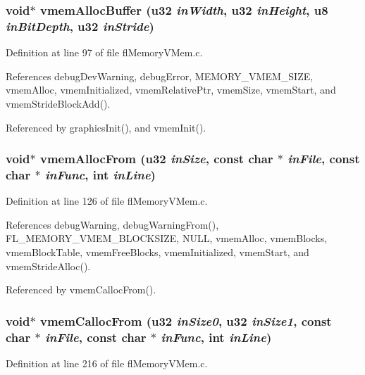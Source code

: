 \subsubsection{\setlength{\rightskip}{0pt plus 5cm}void$\ast$ vmem\-Alloc\-Buffer (u32 {\em in\-Width}, u32 {\em in\-Height}, u8 {\em in\-Bit\-Depth}, u32 {\em in\-Stride})}\label{flMemoryVMem_8h_e971a3895e09e6afd7520db283258211}




Definition at line 97 of file fl\-Memory\-VMem.c.

References debug\-Dev\-Warning, debug\-Error, MEMORY\_\-VMEM\_\-SIZE, vmem\-Alloc, vmem\-Initialized, vmem\-Relative\-Ptr, vmem\-Size, vmem\-Start, and vmem\-Stride\-Block\-Add().

Referenced by graphics\-Init(), and vmem\-Init().
\subsubsection{\setlength{\rightskip}{0pt plus 5cm}void$\ast$ vmem\-Alloc\-From (u32 {\em in\-Size}, const char $\ast$ {\em in\-File}, const char $\ast$ {\em in\-Func}, int {\em in\-Line})}\label{flMemoryVMem_8h_fc3b16b88f6442e62ab9aacc0947e2c4}




Definition at line 126 of file fl\-Memory\-VMem.c.

References debug\-Warning, debug\-Warning\-From(), FL\_\-MEMORY\_\-VMEM\_\-BLOCKSIZE, NULL, vmem\-Alloc, vmem\-Blocks, vmem\-Block\-Table, vmem\-Free\-Blocks, vmem\-Initialized, vmem\-Start, and vmem\-Stride\-Alloc().

Referenced by vmem\-Calloc\-From().
\subsubsection{\setlength{\rightskip}{0pt plus 5cm}void$\ast$ vmem\-Calloc\-From (u32 {\em in\-Size0}, u32 {\em in\-Size1}, const char $\ast$ {\em in\-File}, const char $\ast$ {\em in\-Func}, int {\em in\-Line})}\label{flMemoryVMem_8h_4f45e2c3068d12fc1e2e04303fc5b1c3}




Definition at line 216 of file fl\-Memory\-VMem.c.

